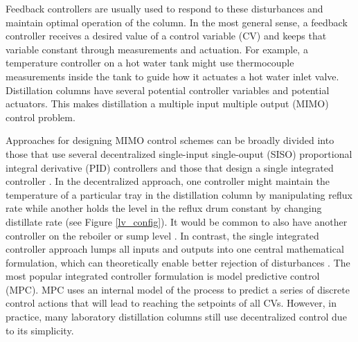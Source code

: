 Feedback controllers are usually used to respond to these disturbances and maintain optimal operation of the column.  In the most general sense, a feedback controller receives a desired value of a control variable (CV) and keeps that variable constant through measurements and actuation. For example, a temperature controller on a hot water tank might use thermocouple measurements inside the tank to guide how it actuates a hot water inlet valve. Distillation columns have several potential controller variables and potential actuators. This makes distillation a multiple input multiple output (MIMO) control problem. 

Approaches for designing MIMO control schemes can be broadly divided into those that use several decentralized single-input single-ouput (SISO) proportional integral derivative (PID) controllers\cite{Behroozsarand2012, Shen1994, Lin2006, Luyben1986} and those that design a single integrated controller \cite{Martin2013, Mesbah2017,Spielberg2019,Terzi2020}. In the decentralized approach, one controller might maintain the temperature of a particular tray in the distillation column by manipulating reflux rate while another holds the level in the reflux drum constant by changing distillate rate (see Figure \ref{lv_config}). It would be common to also have another controller on the reboiler or sump level \cite{Skogestad2007}. In contrast, the single integrated controller approach lumps all inputs and outputs into one central mathematical formulation, which can theoretically enable better rejection of disturbances \cite{Mesbah2017}. The most popular integrated controller formulation is model predictive control (MPC). MPC uses an internal model of the process to predict a series of discrete control actions that will lead to reaching the setpoints of all CVs.  However, in practice, many laboratory distillation columns still use decentralized control due to its simplicity.


